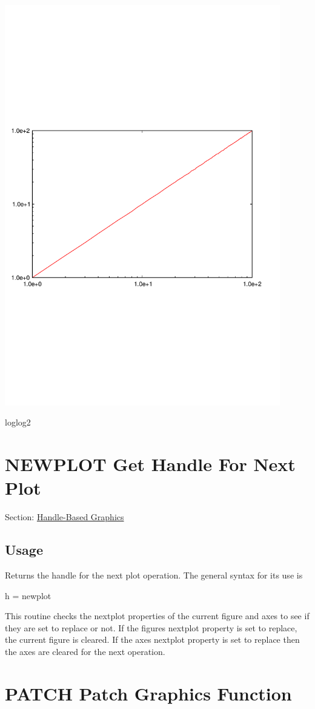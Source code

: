  
\begin{DoxyImage}
\includegraphics[width=12cm]{loglog2}
\caption{loglog2}
\end{DoxyImage}
 \hypertarget{handle_newplot}{}\section{N\-E\-W\-P\-L\-O\-T Get Handle For Next Plot}\label{handle_newplot}
Section\-: \hyperlink{sec_handle}{Handle-\/\-Based Graphics} \hypertarget{vtkwidgets_vtkxyplotwidget_Usage}{}\subsection{Usage}\label{vtkwidgets_vtkxyplotwidget_Usage}
Returns the handle for the next plot operation. The general syntax for its use is \begin{DoxyVerb}  h = newplot
\end{DoxyVerb}
 This routine checks the {\ttfamily nextplot} properties of the current figure and axes to see if they are set to {\ttfamily replace} or not. If the figures {\ttfamily nextplot} property is set to replace, the current figure is cleared. If the axes {\ttfamily nextplot} property is set to {\ttfamily replace} then the axes are cleared for the next operation. \hypertarget{handle_patch}{}\section{P\-A\-T\-C\-H Patch Graphics Function}\label{handle_patch}
